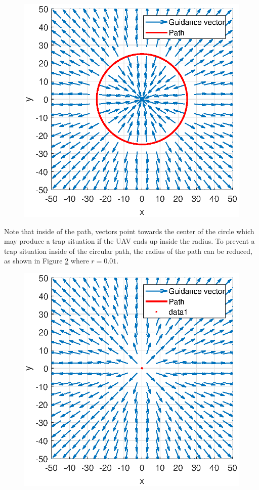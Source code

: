 \documentclass[conf]{new-aiaa}
\begin{document}
\begin{figure}[H]
	\centering
	\includegraphics[width=0.7\linewidth]{Figures/methods/largeRepulsive}
	\caption{}
	\label{fig:largerepulsive}
\end{figure}

Note that inside of the path, vectors point towards the center of the circle which may produce a trap situation if the UAV ends up inside the radius. To prevent a trap situation inside of the circular path, the radius of the path can be reduced, as shown in Figure \ref{fig:normalizedrepulsive} where $r=0.01$.


\begin{figure}[H]
	\centering
	\includegraphics[width=0.7\linewidth]{Figures/methods/normalizedRepulsive}
	\caption{}
	\label{fig:normalizedrepulsive}
\end{figure}
\end{document}
